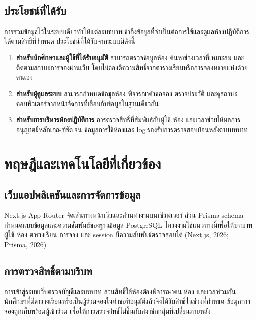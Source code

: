\documentclass[14pt,a4paper,oneside]{extreport}
\begin{document}
\section{ประโยชน์ที่ได้รับ}
การรวมข้อมูลไว้ในระบบเดียวทำให้แต่ละบทบาทเข้าถึงข้อมูลที่จำเป็นต่อการใช้และดูแลห้องปฏิบัติการได้ตามสิทธิ์ที่กำหนด ประโยชน์ที่ได้รับจากระบบมีดังนี้
\begin{enumerate}
\item \textbf{สำหรับนักศึกษาและผู้ใช้ที่ได้รับอนุมัติ} สามารถตรวจข้อมูลห้อง ค้นหาช่วงเวลาที่เหมาะสม และติดตามสถานะการจองผ่านเว็บ โดยไม่ต้องตีความสิทธิ์จากตารางเรียนหรือการจองหลายแห่งด้วยตนเอง
\item \textbf{สำหรับผู้ดูแลระบบ} สามารถกำหนดข้อมูลห้อง พิจารณาคำขอจอง ตรวจประวัติ และดูสถานะคอมพิวเตอร์จากหน้าจัดการที่เชื่อมกับข้อมูลในฐานเดียวกัน
\item \textbf{สำหรับการบริหารห้องปฏิบัติการ} การตรวจสิทธิ์ที่สัมพันธ์กับผู้ใช้ ห้อง และเวลาช่วยให้ผลการอนุญาตมีหลักเกณฑ์ชัดเจน ข้อมูลการใช้ห้องและ log รองรับการตรวจสอบย้อนหลังตามบทบาท
\end{enumerate}

\chapter{ทฤษฎีและเทคโนโลยีที่เกี่ยวข้อง}
\section{เว็บแอปพลิเคชันและการจัดการข้อมูล}
Next.js App Router จัดเส้นทางหน้าเว็บและส่วนทำงานบนเซิร์ฟเวอร์ ส่วน Prisma schema กำหนดแบบข้อมูลและความสัมพันธ์ของฐานข้อมูล PostgreSQL โครงงานใช้แนวทางนี้เพื่อให้บทบาทผู้ใช้ ห้อง ตารางเรียน การจอง และ session มีความสัมพันธ์ตรวจสอบได้ (Next.js, 2026; Prisma, 2026)

\section{การตรวจสิทธิ์ตามบริบท}
การเข้าสู่ระบบเว็บตรวจบัญชีและบทบาท ส่วนสิทธิ์ใช้ห้องต้องพิจารณาคน ห้อง และเวลาร่วมกัน นักศึกษาที่มีตารางเรียนหรือเป็นผู้ร่วมจองในคำขอที่อนุมัติแล้วจึงได้รับสิทธิ์ในช่วงที่กำหนด ข้อมูลการจองถูกเก็บพร้อมผู้เข้าร่วม เพื่อให้การตรวจสิทธิ์ไม่ขึ้นกับสมาชิกกลุ่มที่เปลี่ยนภายหลัง
\end{document}

